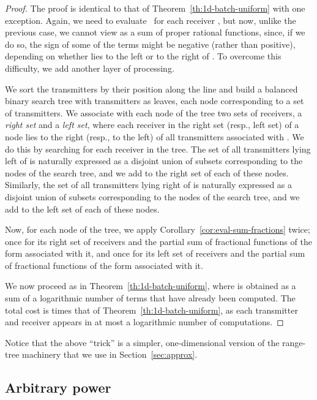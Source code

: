 \documentclass[11pt]{article}
\theoremstyle{remark}
\begin{document}
\begin{proof}
  The proof is identical to that of Theorem~\ref{th:1d-batch-uniform} with one exception.
Again, we need to evaluate~ for each receiver , but now, unlike the previous case, we cannot view  as a sum of proper rational functions, since, if we do so, the sign of some of the terms might be negative (rather than positive), depending on whether  lies to the left or to the right of . To overcome this difficulty, we add another layer of processing.
	
	
  We sort the transmitters  by their position along the line and build a balanced binary search tree with transmitters as leaves, each node corresponding to a set of transmitters.  We associate with each node of the tree two sets of receivers, a \emph{right set} and a \emph{left set}, where each receiver in the right set (resp., left set) of a node  lies to the right (resp., to the left) of all transmitters associated with . We do this by searching for each receiver  in the tree.  The set of all transmitters lying left of  is naturally expressed as a disjoint union of  subsets corresponding to the nodes of the search tree, and we add  to the right set of each of these nodes.
  Similarly, the set of all transmitters lying right of  is naturally expressed as a disjoint union of  subsets corresponding to the nodes of the search tree, and we add  to the left set of each of these nodes.
	
  Now, for each node of the tree, we apply Corollary~\ref{cor:eval-sum-fractions} twice; once for its right set of receivers and the partial sum of fractional functions of the form  associated with it, and once for its left set of receivers and the partial sum of fractional functions of the form  associated with it.
		
  We now proceed as in Theorem~\ref{th:1d-batch-uniform}, where  is obtained as a sum of a logarithmic number of terms that have already been computed. The total cost is  times that of Theorem~\ref{th:1d-batch-uniform}, as each transmitter and receiver appears in at most a logarithmic number of computations.
\end{proof}

Notice that the above ``trick'' is a simpler, one-dimensional version of the range-tree machinery that we use in Section~\ref{sec:approx}.



\subsection{Arbitrary power}
\label{sec:1d-non-uni}
\end{document}
